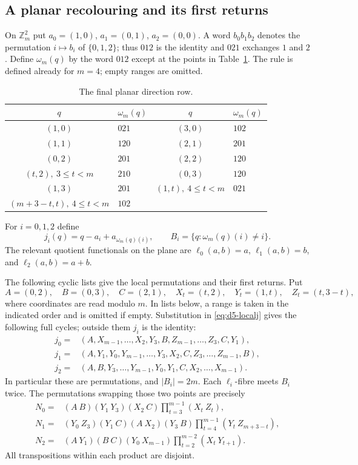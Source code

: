 \documentclass[11pt,reqno]{amsart}
\numberwithin{equation}{section}
\theoremstyle{definition}
\theoremstyle{remark}
\newcommand{\Zm}{\mathbb Z_m}
\begin{document}
\subsection{A planar recolouring and its first returns}
On $\Zm^2$ put $a_0=(1,0)$, $a_1=(0,1)$, $a_2=(0,0)$. A word
$b_0b_1b_2$ denotes the permutation $i\mapsto b_i$ of $\{0,1,2\}$;
thus $012$ is the identity and $021$ exchanges $1$ and $2$.
Define $\omega_m(q)$ by the word $012$ except at the points in
Table~\ref{tab:d5-omega}.
The rule is defined already for $m=4$; empty ranges are omitted.
\begin{table}[htbp]
\centering\small
\caption{The final planar direction row.}\label{tab:d5-omega}
\begin{tabular}{cl@{\qquad}cl}
\toprule
$q$&$\omega_m(q)$&$q$&$\omega_m(q)$\\\midrule
$(1,0)$&$021$&$(3,0)$&$102$\\
$(1,1)$&$120$&$(2,1)$&$201$\\
$(0,2)$&$201$&$(2,2)$&$120$\\
$(t,2),\ 3\le t<m$&$210$&$(0,3)$&$120$\\
$(1,3)$&$201$&$(1,t),\ 4\le t<m$&$021$\\
$(m+3-t,t),\ 4\le t<m$&$102$&&\\\bottomrule
\end{tabular}
\end{table}

For $i=0,1,2$ define
\begin{equation}\label{eq:d5-localj}
 j_i(q)=q-a_i+a_{\omega_m(q)(i)},\qquad
 B_i=\{q:\omega_m(q)(i)\ne i\}.
\end{equation}
The relevant quotient functionals on the plane are
$\ell_0(a,b)=a$, $\ell_1(a,b)=b$, and $\ell_2(a,b)=a+b$.

The following cyclic lists give the local permutations and their first returns. Put
\[
 A=(0,2),\quad B=(0,3),\quad C=(2,1),\quad
 X_t=(t,2),\quad Y_t=(1,t),\quad Z_t=(t,3-t),
\]
where coordinates are read modulo $m$. In lists below, a range is taken in the
indicated order and is omitted if empty. Substitution in
\eqref{eq:d5-localj} gives the following full cycles; outside them $j_i$ is the
identity:
\begin{align}
 j_0={}&(A, X_{m-1},\ldots,X_2,Y_3,B,Z_{m-1},\ldots,Z_3,C,Y_1),\label{eq:d5-j0}\\
 j_1={}&(A,Y_1,Y_0,Y_{m-1},\ldots,Y_3,X_2,C,Z_3,\ldots,Z_{m-1},B),\label{eq:d5-j1}\\
 j_2={}&(A,B,Y_3,\ldots,Y_{m-1},Y_0,Y_1,C,X_2,\ldots,X_{m-1}).\label{eq:d5-j2}
\end{align}
In particular these are permutations, and $|B_i|=2m$.
Each $\ell_i$-fibre meets $B_i$ twice. The permutations swapping those two points
are precisely
\begin{align}
 N_0={}&(A\ B)(Y_1\ Y_3)(X_2\ C)
          \prod_{t=3}^{m-1}(X_t\ Z_t),\label{eq:d5-N0}\\
 N_1={}&(Y_0\ Z_3)(Y_1\ C)(A\ X_2)(Y_3\ B)
          \prod_{t=4}^{m-1}(Y_t\ Z_{m+3-t}),\label{eq:d5-N1}\\
 N_2={}&(A\ Y_1)(B\ C)(Y_0\ X_{m-1})
          \prod_{t=2}^{m-2}(X_t\ Y_{t+1}).\label{eq:d5-N2}
\end{align}
All transpositions within each product are disjoint.
\end{document}
